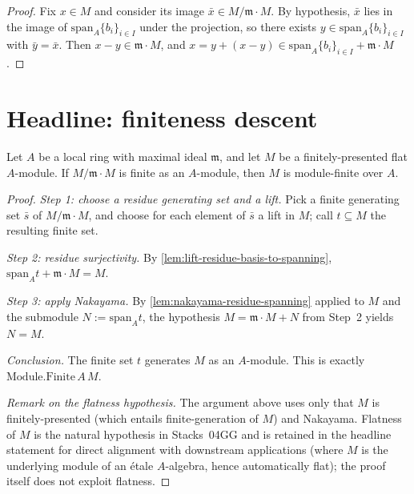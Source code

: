\begin{proof}
  \leanok
  Fix \(x \in M\) and consider its image \(\bar x \in M / \mathfrak{m} \cdot M\).
  By hypothesis, \(\bar x\) lies in the image of
  \(\mathrm{span}_A \{b_i\}_{i \in I}\) under the projection,
  so there exists \(y \in \mathrm{span}_A \{b_i\}_{i \in I}\) with
  \(\bar y = \bar x\). Then \(x - y \in \mathfrak{m} \cdot M\), and
  \(x = y + (x - y) \in \mathrm{span}_A \{b_i\}_{i \in I}
  + \mathfrak{m} \cdot M\).
\end{proof}

\section{Headline: finiteness descent}

\begin{theorem}
  \label{thm:finite-of-finite-residue-flat-local}
  Let \(A\) be a local ring with maximal ideal \(\mathfrak{m}\),
  and let \(M\) be a finitely-presented flat \(A\)-module. If
  \(M / \mathfrak{m} \cdot M\) is finite as an \(A\)-module, then
  \(M\) is module-finite over \(A\).
\end{theorem}

\begin{proof}
  \leanok
  \emph{Step 1: choose a residue generating set and a lift.}
  Pick a finite generating set \(\bar s\) of
  \(M / \mathfrak{m} \cdot M\), and choose for each element of
  \(\bar s\) a lift in \(M\); call \(t \subseteq M\) the resulting
  finite set.

  \emph{Step 2: residue surjectivity.} By
  \cref{lem:lift-residue-basis-to-spanning},
  \(\mathrm{span}_A t + \mathfrak{m} \cdot M = M\).

  \emph{Step 3: apply Nakayama.} By
  \cref{lem:nakayama-residue-spanning} applied to \(M\) and the
  submodule \(N := \mathrm{span}_A t\), the hypothesis
  \(M = \mathfrak{m} \cdot M + N\) from Step~2 yields \(N = M\).

  \emph{Conclusion.} The finite set \(t\) generates \(M\) as an
  \(A\)-module. This is exactly \(\mathrm{Module.Finite}\,A\,M\).

  \emph{Remark on the flatness hypothesis.} The argument above
  uses only that \(M\) is finitely-presented (which entails
  finite-generation of \(M\)) and Nakayama. Flatness of \(M\) is
  the natural hypothesis in Stacks~04GG and is retained in the
  headline statement for direct alignment with downstream
  applications (where \(M\) is the underlying module of an étale
  \(A\)-algebra, hence automatically flat); the proof itself does
  not exploit flatness.
\end{proof}

